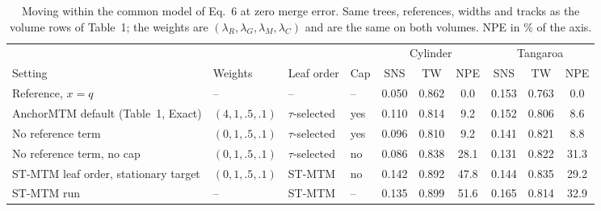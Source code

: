 \begin{table}[!htb]
\centering
\caption{Moving within the common model of Eq.~6 at zero merge error. Same trees, references, widths and tracks as the volume rows of Table~1; the weights are $(\lambda_R,\lambda_G,\lambda_M,\lambda_C)$ and are the same on both volumes. NPE in \% of the axis.}
\label{tab:family}
\footnotesize
\begin{tabular}{@{}llll ccc ccc@{}}
\toprule
 & & & & \multicolumn{3}{c}{Cylinder} & \multicolumn{3}{c}{Tangaroa} \\
\cmidrule(lr){5-7}\cmidrule(l){8-10}
Setting & Weights & Leaf order & Cap & SNS & TW & NPE & SNS & TW & NPE \\
\midrule
Reference, $x=q$ & -- & -- & -- & 0.050 & 0.862 & 0.0 & 0.153 & 0.763 & 0.0 \\
AnchorMTM default (Table~1, Exact) & $(4,1,.5,.1)$ & $\tau$-selected & yes & 0.110 & 0.814 & 9.2 & 0.152 & 0.806 & 8.6 \\
No reference term & $(0,1,.5,.1)$ & $\tau$-selected & yes & 0.096 & 0.810 & 9.2 & 0.141 & 0.821 & 8.8 \\
No reference term, no cap & $(0,1,.5,.1)$ & $\tau$-selected & no & 0.086 & 0.838 & 28.1 & 0.131 & 0.822 & 31.3 \\
ST-MTM leaf order, stationary target & $(0,1,.5,.1)$ & ST-MTM & no & 0.142 & 0.892 & 47.8 & 0.144 & 0.835 & 29.2 \\
ST-MTM run & -- & ST-MTM & -- & 0.135 & 0.899 & 51.6 & 0.165 & 0.814 & 32.9 \\
\bottomrule
\end{tabular}
\end{table}
